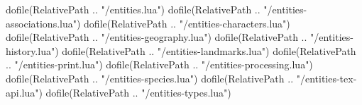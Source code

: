 
\begin{luacode*}
	dofile(RelativePath .. "/entities.lua")
	dofile(RelativePath .. "/entities-associations.lua")
	dofile(RelativePath .. "/entities-characters.lua")
	dofile(RelativePath .. "/entities-geography.lua")
	dofile(RelativePath .. "/entities-history.lua")
	dofile(RelativePath .. "/entities-landmarks.lua")
	dofile(RelativePath .. "/entities-print.lua")
	dofile(RelativePath .. "/entities-processing.lua")
	dofile(RelativePath .. "/entities-species.lua")
	dofile(RelativePath .. "/entities-tex-api.lua")
	dofile(RelativePath .. "/entities-types.lua")
\end{luacode*}

\newcommand{\setDefaultLocation}[1]{
	\directlua{DefaultLocation = "#1"}
}

\newcommand{\resetCurrentLabels}{
	\setDefaultLocation{}
	\directlua{
		LogError("Use of deprecated function resetCurrentLabels.")
	}
}

\newcommand{\newEntity}[4]{
	\directlua{
		NewEntity("#1","#2", [[\detokenize{#3}]], [[\detokenize{#4}]])
	}
}

\newcommand{\newPlace}[3]{
	\newEntity{#1}{place}{#2}{#3}
}

\newcommand{\declarePC}[1]{
	\directlua{DeclarePC("#1")}
}

\newcommand{\newNPC}[3]{
	\directlua{
		NewCharacter("#1", [[\detokenize{#2}]], [[\detokenize{#3}]])
	}
}

\newcommand{\newGod}[3]{
	\newEntity{#1}{god}{#2}{#3}
	\setSpecies{gott}
}

\newcommand{\charappearance}[3]{
	\addDescriptor[Körper:]{Erscheinung}{#1}
	\addDescriptor[Kleidung und Ausrüstung:]{Erscheinung}{#2}
	\addDescriptor[Stimme / Verhalten:]{Erscheinung}{#3}
}

\newcommand{\newOrganisation}[3]{
	\newEntity{#1}{organisations}{#2}{#3}
}

\newcommand{\newFamily}[3]{
	\newEntity{#1}{families}{#2}{#3}
}

\newcommand{\newShip}[3]{
	\newEntity{#1}{ships}{#2}{#3}
}

\newcommand{\newSpecies}[3]{
	\newEntity{#1}{species}{#2}{#3}
}

\newcommand{\newLanguage}[3]{
	\newEntity{#1}{languages}{#2}{#3}
}

\newcommand{\newClass}[2]{
	\newEntity{#1}{classes}{}{#2}
}

\newcommand{\newSubclass}[2]{
	\newEntity{#1}{subclasses}{}{#2}
}

\newcommand{\newSpell}[2]{
	\newEntity{#1}{spells}{}{#2}
}

